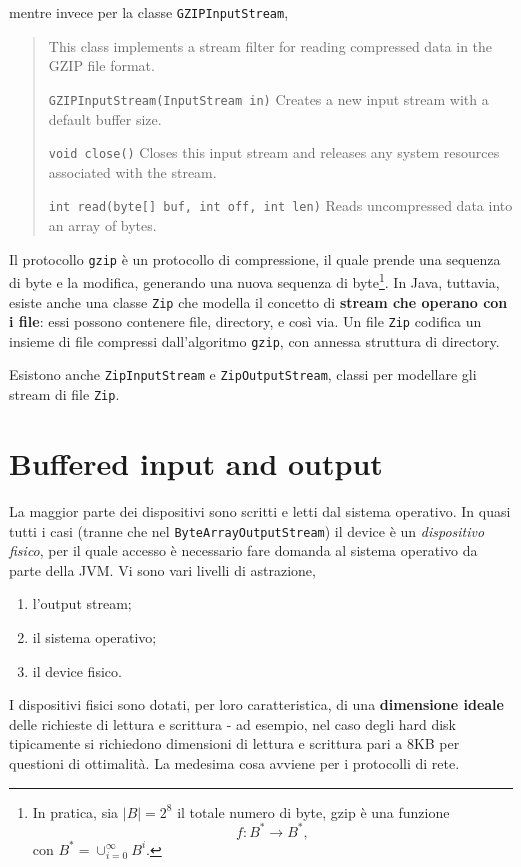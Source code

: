 \documentclass[\fontsizeclass,twocolumn]{\classname}
\theoremstyle{definition}
\theoremstyle{definition}
\begin{document}
mentre invece per la classe \texttt{GZIPInputStream},

\begin{quote}
    \footnotesize{This class implements a stream filter for reading compressed data in the GZIP file format.

        \texttt{GZIPInputStream(InputStream in)} 	Creates a new input stream with a default buffer size.

        \texttt{void 	close()} 	Closes this input stream and releases any system resources associated with the stream.

    \texttt{int 	read(byte[] buf, int off, int len)} 	Reads uncompressed data into an array of bytes.
}
\end{quote}

Il protocollo \texttt{gzip} è un protocollo di compressione, il quale prende
una sequenza di byte e la modifica, generando una nuova sequenza di
byte\footnote{In pratica, sia $|B| = 2^8$ il totale numero di byte, gzip è una
funzione $$f:B^* \rightarrow B^*,$$ con $B^* = \cup_{i=0}^{\infty} B^i$.}. In
Java, tuttavia, esiste anche una classe \texttt{Zip} che modella il concetto di
\textbf{stream che operano con i file}: essi possono contenere file,
directory, e così via. Un file \texttt{Zip} codifica un insieme di file
compressi dall'algoritmo \texttt{gzip}, con annessa struttura di directory.

Esistono anche \texttt{ZipInputStream} e \texttt{ZipOutputStream}, classi per
modellare gli stream di file \texttt{Zip}.

\section{Buffered input and output}

La maggior parte dei dispositivi sono scritti e letti dal sistema operativo. In
quasi tutti i casi (tranne che nel \texttt{ByteArrayOutputStream}) il device è
un \emph{dispositivo fisico}, per il quale accesso è necessario fare domanda al
sistema operativo da parte della JVM. Vi sono vari livelli di astrazione,
\begin{enumerate}
    \item l'output stream;
    \item il sistema operativo;
    \item il device fisico.
\end{enumerate}

I dispositivi fisici sono dotati, per loro caratteristica, di una
\textbf{dimensione ideale} delle richieste di lettura e scrittura \-- ad
esempio, nel caso degli hard disk tipicamente si richiedono dimensioni di
lettura e scrittura pari a 8KB per questioni di ottimalità. La medesima cosa
avviene per i protocolli di rete.
\end{document}
